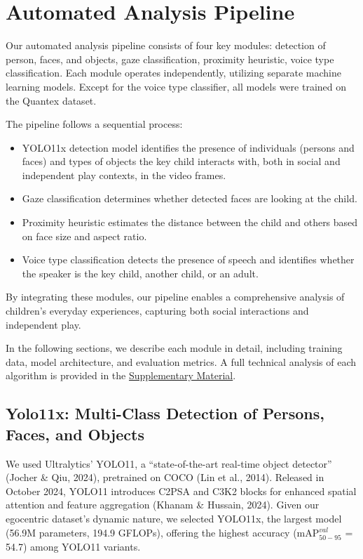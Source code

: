 \documentclass[
  man,floatsintext]{apa6}
\providecommand{\tightlist}{%
  \setlength{\itemsep}{0pt}\setlength{\parskip}{0pt}}
\begin{document}
\section{Automated Analysis Pipeline}\label{automatic-analysis}

Our automated analysis pipeline consists of four key modules: detection of person, faces, and objects, gaze classification, proximity heuristic, voice type classification. Each module operates independently, utilizing separate machine learning models. Except for the voice type classifier, all models were trained on the Quantex dataset.

The pipeline follows a sequential process:

\begin{itemize}
\tightlist
\item
  YOLO11x detection model identifies the presence of individuals (persons and faces) and types of objects the key child interacts with, both in social and independent play contexts, in the video frames.
\item
  Gaze classification determines whether detected faces are looking at the child.
\item
  Proximity heuristic estimates the distance between the child and others based on face size and aspect ratio.
\item
  Voice type classification detects the presence of speech and identifies whether the speaker is the key child, another child, or an adult.
\end{itemize}

By integrating these modules, our pipeline enables a comprehensive analysis of children's everyday experiences, capturing both social interactions and independent play.

In the following sections, we describe each module in detail, including training data, model architecture, and evaluation metrics. A full technical analysis of each algorithm is provided in the \hyperref[supplementary-material]{Supplementary Material}.

\subsection{Yolo11x: Multi-Class Detection of Persons, Faces, and Objects}\label{yolo11x}

We used Ultralytics' YOLO11, a ``state-of-the-art real-time object detector'' (Jocher \& Qiu, 2024), pretrained on COCO (Lin et al., 2014). Released in October 2024, YOLO11 introduces C2PSA and C3K2 blocks for enhanced spatial attention and feature aggregation (Khanam \& Hussain, 2024). Given our egocentric dataset's dynamic nature, we selected YOLO11x, the largest model (56.9M parameters, 194.9 GFLOPs), offering the highest accuracy (mAP\(^{val}_{50-95}\) = 54.7) among YOLO11 variants.
\end{document}
